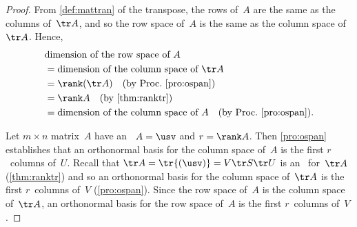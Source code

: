 \begin{proof} 
From \autoref{def:mattran} of the transpose, the rows of~\(A\) are the same as the columns of~\(\tr A\), and so the row space of~\(A\) is the same as the column space of~\(\tr A\).  
Hence,
\begin{align*}
&\text{dimension of the row space of }A
\\&=\text{dimension of the column space of }\tr A
\\&=\rank(\tr A) \quad(\text{by Proc.~\ref{pro:ospan}})
\\&=\rank A \quad(\text{by \autoref{thm:ranktr}})
\\&=\text{dimension of the column space of }A
\quad(\text{by Proc.~\ref{pro:ospan}}).
\end{align*}

Let \(m\times n\) matrix~\(A\) have an \svd\ \(A=\usv\) and \(r=\rank A\).
Then \autoref{pro:ospan} establishes that an orthonormal basis for the column space of~\(A\) is the first \(r\)~columns of~\(U\).
Recall that \(\tr A=\tr{(\usv)} =V\tr S\tr U\) is an \svd\ for~\(\tr A\) (\autoref{thm:ranktr}) and so an orthonormal basis for the column space of~\(\tr A\) is the first \(r\)~columns of~\(V\) (\autoref{pro:ospan}).
Since the row space of~\(A\) is the column space of~\(\tr A\), an orthonormal basis for the row space of~\(A\) is the first \(r\)~columns of~\(V\).
\end{proof}


